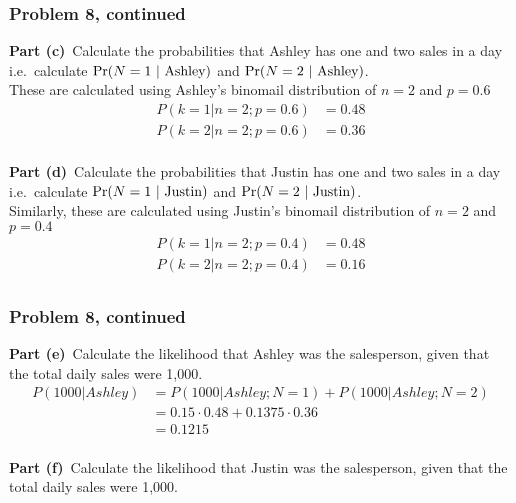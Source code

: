 \documentclass[12pt]{article}
\theoremstyle{definition}
\begin{document}
\newpage
\subsubsection*{Problem 8, continued}
\noindent
{\bf Part (c)}\ Calculate the probabilities that Ashley has one and two sales in a day i.e.\ calculate $\Pr(N = 1\ |\ \hbox{Ashley})$ and $\Pr(N = 2\ |\ \hbox{Ashley})$.\\

These are calculated using Ashley's binomail distribution of $n = 2$ and $p = 0.6$
\begin{align*}
P(k = 1|n = 2;p = 0.6) &= 0.48\\
P(k = 2|n = 2;p = 0.6) &= 0.36\\
\end{align*}



\vspace{3in}
\noindent
{\bf Part (d)}\ Calculate the probabilities that Justin has one and two sales in a day i.e.\ calculate $\Pr(N = 1\ |\ \hbox{Justin})$ and $\Pr(N = 2\ |\ \hbox{Justin})$.\\

Similarly, these are calculated using Justin's binomail distribution of $n = 2$ and $p = 0.4$
\begin{align*}
P(k = 1|n = 2;p = 0.4) &= 0.48\\
P(k = 2|n = 2;p = 0.4) &= 0.16\\
\end{align*}


\newpage
\subsubsection*{Problem 8, continued}
\noindent
{\bf Part (e)}\ Calculate the likelihood that Ashley was the salesperson, given that the total daily sales were 1,000.\\

\begin{align*}
P(1000|Ashley) &= P(1000|Ashley;N=1) + P(1000|Ashley;N=2)\\
&= 0.15 \cdot 0.48 +  0.1375 \cdot 0.36\\
&= 0.1215\\
\end{align*}




\vspace{3in}
\noindent
{\bf Part (f)}\ Calculate the likelihood that Justin was the salesperson, given that the total daily sales were 1,000.\\
\end{document}
